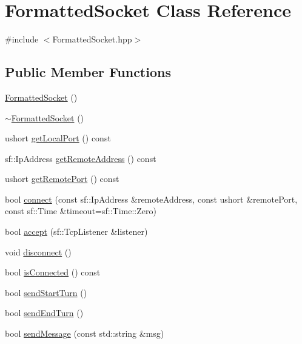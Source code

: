 \hypertarget{class_formatted_socket}{}\section{Formatted\+Socket Class Reference}
\label{class_formatted_socket}


{\ttfamily \#include $<$Formatted\+Socket.\+hpp$>$}

\subsection*{Public Member Functions}
\begin{DoxyCompactItemize}
\item 
\mbox{\hyperlink{class_formatted_socket_a0c1d95da4ef859d754e634df0d2d80a2}{Formatted\+Socket}} ()
\item 
\mbox{\hyperlink{class_formatted_socket_a57919c89221556fbd836c61f9ee3d62c}{$\sim$\+Formatted\+Socket}} ()
\item 
ushort \mbox{\hyperlink{class_formatted_socket_a92c58f5322606d1dbcd61cea00ee4da5}{get\+Local\+Port}} () const
\item 
sf\+::\+Ip\+Address \mbox{\hyperlink{class_formatted_socket_af9aee61bd02f369a9980b2402fef1db9}{get\+Remote\+Address}} () const
\item 
ushort \mbox{\hyperlink{class_formatted_socket_af2b9a1624c78a3117cceb313d9b1eb50}{get\+Remote\+Port}} () const
\item 
bool \mbox{\hyperlink{class_formatted_socket_a41c035d03d50a2a0b971e0ff2b8aadeb}{connect}} (const sf\+::\+Ip\+Address \&remote\+Address, const ushort \&remote\+Port, const sf\+::\+Time \&timeout=sf\+::\+Time\+::\+Zero)
\item 
bool \mbox{\hyperlink{class_formatted_socket_a857affefd4b2a9e37acdf9bac488ada0}{accept}} (sf\+::\+Tcp\+Listener \&listener)
\item 
void \mbox{\hyperlink{class_formatted_socket_a4b64885e3fb07ac50107facd1114050d}{disconnect}} ()
\item 
bool \mbox{\hyperlink{class_formatted_socket_a4722eb52bc78fab1d1ac7f374e35ebb7}{is\+Connected}} () const
\item 
bool \mbox{\hyperlink{class_formatted_socket_a5c58704fe70fe65a7fd792b525f91fba}{send\+Start\+Turn}} ()
\item 
bool \mbox{\hyperlink{class_formatted_socket_ab98014a2e9e3125a2cf16b0a796c9565}{send\+End\+Turn}} ()
\item 
bool \mbox{\hyperlink{class_formatted_socket_aacfbf336982a59ad769e7f640cee630f}{send\+Message}} (const std\+::string \&msg)

\end{DoxyCompactItemize}
